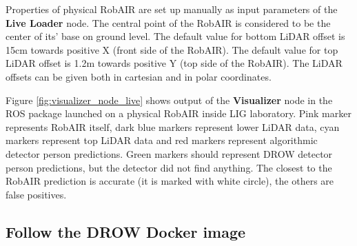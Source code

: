 \documentclass{article}
\begin{document}
Properties of physical RobAIR are set up manually as input parameters of the \textbf{Live Loader} node.
The central point of the RobAIR is considered to be the center of its' base on ground level.
The default value for bottom LiDAR offset is 15cm towards positive X (front side of the RobAIR).
The default value for top LiDAR offset is 1.2m towards positive Y (top side of the RobAIR).
The LiDAR offsets can be given both in cartesian and in polar coordinates.

Figure \ref{fig:visualizer_node_live} shows output of the \textbf{Visualizer} node in the ROS package launched on a physical RobAIR inside LIG laboratory.
Pink marker represents RobAIR itself, dark blue markers represent lower LiDAR data, cyan markers represent top LiDAR data and red markers represent algorithmic detector person predictions.
Green markers should represent DROW detector person predictions, but the detector did not find anything.
The closest to the RobAIR prediction is accurate (it is marked with white circle), the others are false positives.

\subsection{Follow the DROW Docker image}
\end{document}
